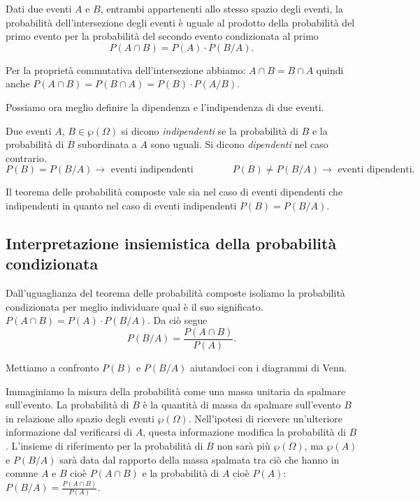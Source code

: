 \begin{teorema}
Dati due eventi $A$ e $B$, entrambi appartenenti allo stesso spazio degli eventi, la probabilità dell'intersezione degli eventi è uguale al prodotto della probabilità del primo evento per la probabilità del secondo evento condizionata al primo
\[P(A\cap B)=P(A)\cdot P(B/A).\]
\end{teorema}

Per la proprietà commutativa dell'intersezione abbiamo: $A\cap B=B\cap A$ quindi anche $P(A\cap B)=P(B\cap A)=P(B)\cdot P(A/B)$.

Possiamo ora meglio definire la dipendenza e l'indipendenza di due eventi.

\begin{definizione}
Due eventi $A$, $B\in \wp(\Omega)$ si dicono \emph{indipendenti} se la probabilità di $B$ e la probabilità di $B$ subordinata a $A$ sono uguali. Si dicono \emph{dipendenti} nel caso contrario.
\[P(B)=P(B/A)\to \text{ eventi indipendenti}\qquad\qquad
{P}(B)\neq P(B/A)\to \text{ eventi dipendenti.}\]
\end{definizione}

\osservazione Il teorema delle probabilità composte vale sia nel caso di eventi dipendenti che indipendenti in quanto nel caso di eventi indipendenti $P(B)=P(B/A)$.

\subsection{Interpretazione insiemistica della probabilità condizionata}\label{pr_cond}

Dall'uguaglianza del teorema delle probabilità composte isoliamo la probabilità condizionata per meglio individuare qual è il suo significato. $P(A\cap B)=P(A)\cdot P(B/A)$. Da ciò segue 
\[P(B/A)=\frac{P(A\cap B)}{P(A)}.\]

Mettiamo a confronto $P(B)$ e $P(B/A)$ aiutandoci con i diagrammi di Venn.
\begin{center}
 
\end{center}
Immaginiamo la misura della probabilità come una massa unitaria da spalmare sull'evento. La probabilità di $B$ è la quantità di massa da spalmare sull'evento $B$ in relazione allo spazio degli eventi $\wp(\Omega)$. Nell'ipotesi di ricevere un'ulteriore informazione dal verificarsi di $A$, questa informazione modifica la probabilità di $B$. L'insieme di riferimento per la probabilità di $B$ non sarà più $\wp(\Omega)$, ma $\wp(A)$ e $P(B/A)$ sarà data dal rapporto della massa spalmata tra ciò che hanno in comune $A$ e $B$ cioè $P(A\cap B)$ e la probabilità di $A$ cioè $P(A)$: $P(B/A)=\frac{P(A\cap B)}{P(A)}$.

